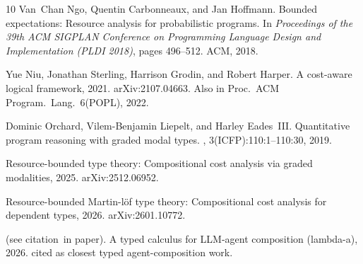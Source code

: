 \documentclass[11pt]{article}
\theoremstyle{plain}
\begin{document}
\begin{thebibliography}{10}
Van~Chan Ngo, Quentin Carbonneaux, and Jan Hoffmann.
\newblock Bounded expectations: Resource analysis for probabilistic programs.
\newblock In {\em Proceedings of the 39th ACM SIGPLAN Conference on Programming
  Language Design and Implementation (PLDI 2018)}, pages 496--512. ACM, 2018.

Yue Niu, Jonathan Sterling, Harrison Grodin, and Robert Harper.
\newblock A cost-aware logical framework, 2021.
\newblock arXiv:2107.04663. Also in Proc.\ ACM Program.\ Lang.\ 6(POPL), 2022.

Dominic Orchard, Vilem-Benjamin Liepelt, and Harley Eades~III.
\newblock Quantitative program reasoning with graded modal types.
,
  3(ICFP):110:1--110:30, 2019.

Resource-bounded type theory: Compositional cost analysis via graded
  modalities, 2025.
\newblock arXiv:2512.06952.

Resource-bounded {M}artin-l\"{o}f type theory: Compositional cost analysis for
  dependent types, 2026.
\newblock arXiv:2601.10772.

(see citation~in paper).
\newblock A typed calculus for {LLM}-agent composition (lambda-a), 2026.
\newblock cited as closest typed agent-composition work.

\end{thebibliography}
\end{document}
